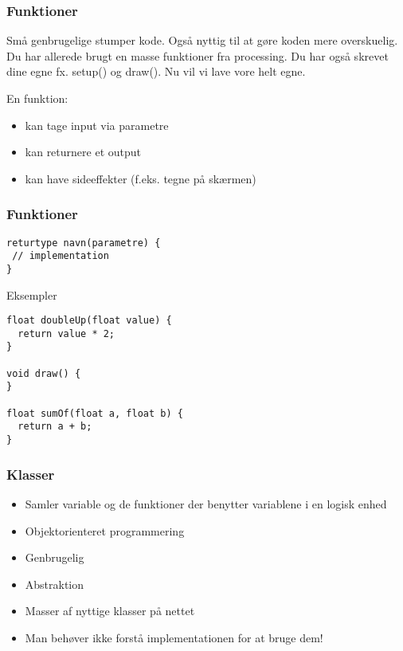 \documentclass{beamer}
\begin{document}
\begin{frame}[fragile]
  \frametitle{Funktioner}
  
  Små genbrugelige stumper kode. Også nyttig til at gøre koden mere overskuelig.\\
  \vspace{0.5cm}
  Du har allerede brugt en masse funktioner fra processing. Du har også skrevet dine egne fx. setup() og draw(). Nu vil vi lave vore helt egne.
  
  \begin{block}{En funktion:} 
  \begin{itemize}
  \item kan tage input via parametre
  \item kan returnere et output
  \item kan have sideeffekter (f.eks. tegne på skærmen)
  \end{itemize}
  \end{block}

\end{frame}


\begin{frame}[fragile]
  \frametitle{Funktioner}
    
\begin{verbatim}
returtype navn(parametre) {
 // implementation
}
\end{verbatim}
  
  \begin{block}{Eksempler}
\begin{verbatim}
float doubleUp(float value) {
  return value * 2;
}

void draw() {
}

float sumOf(float a, float b) {
  return a + b;
}
\end{verbatim}    
  \end{block}

\end{frame}

\begin{frame}
  \frametitle{Klasser}

  \begin{itemize}
  \item Samler variable og de funktioner der benytter variablene i en logisk enhed
  \item Objektorienteret programmering
  \item Genbrugelig
  \item Abstraktion
  \item Masser af nyttige klasser på nettet
  \item Man behøver ikke forstå implementationen for at bruge dem! 
  \end{itemize}

\end{frame}
\end{document}
